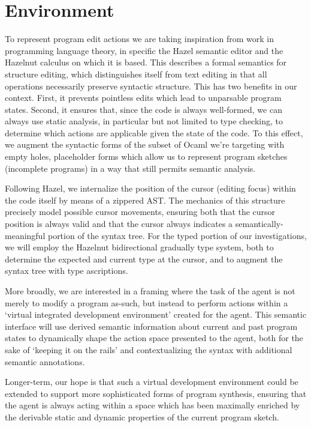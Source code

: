\documentclass{article}
\begin{document}
\section{Environment}
\hspace{16}To represent program edit actions we are taking inspiration from work in programming language theory, in specific the Hazel semantic editor and the Hazelnut calculus on which it is based. This describes a formal semantics for structure editing, which distinguishes itself from text editing in that all operations necessarily preserve syntactic structure. This has two benefits in our context. First, it prevents pointless edits which lead to unparsable program states. Second, it ensures that, since the code is always well-formed, we can always use static analysis, in particular but not limited to type checking, to determine which actions are applicable given the state of the code. To this effect, we augment the syntactic forms of the subset of Ocaml we’re targeting with empty holes, placeholder forms which allow us to represent program sketches (incomplete programs) in a way that still permits semantic analysis.

\hspace{16}Following Hazel, we internalize the position of the cursor (editing focus) within the code itself by means of a zippered AST. The mechanics of this structure precisely model possible cursor movements, ensuring both that the cursor position is always valid and that the cursor always indicates a semantically-meaningful portion of the syntax tree. For the typed portion of our investigations, we will employ the Hazelnut bidirectional gradually type system, both to determine the expected and current type at the cursor, and to augment the syntax tree with type ascriptions.

\hspace{16}More broadly, we are interested in a framing where the task of the agent is not merely to modify a program as-such, but instead to perform actions within a ‘virtual integrated development environment’ created for the agent. This semantic interface will use derived semantic information about current and past program states to dynamically shape the action space presented to the agent, both for the sake of ‘keeping it on the rails’ and contextualizing the syntax with additional semantic annotations.

\hspace{16}Longer-term, our hope is that such a virtual development environment could be extended to support more sophisticated forms of program synthesis, ensuring that the agent is always acting within a space which has been maximally enriched by the derivable static and dynamic properties of the current program sketch.
\end{document}
